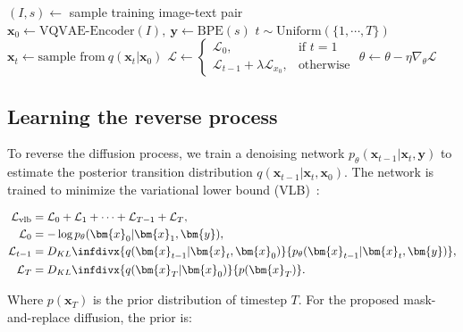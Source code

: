 \begin{algorithm}[t]
	\caption{Training of the VQ-Diffusion, given transition matrix $\{\bm{Q}_t\}$, initial network parameters $\theta$, loss weight $\lambda$, learning rate $\eta$.} \label{alg:training}
	\begin{algorithmic}[1]
		\Repeat \State $(I, s) \gets $ sample training image-text pair \State $\bm{x}_0 \gets \text{VQVAE-Encoder}(I), ~ \bm{y} \gets \text{BPE}(s)$
		\State $t \sim \text{Uniform}(\{1, \cdots, T\})$
		\State $\bm{x}_{t} \gets  \text{sample from}~q(\bm{x}_t|\bm{x}_0)$ 
		\State $\mathcal{L} \gets \begin{cases}
			\mathcal{L}_0, &\text{if } t = 1 \\
			\mathcal{L}_{t-1} + \lambda \mathcal{L}_{x_0}, &\text{otherwise}
		\end{cases}$ 
		\State $\theta \gets \theta - \eta \nabla_\theta \mathcal{L}$ 
	\end{algorithmic}
\end{algorithm}

\subsection{Learning the reverse process} To reverse the diffusion process, we train a denoising network $p_\theta(\bm{x}_{t-1}|\bm{x}_t,\bm{y})$ to estimate the posterior transition distribution $q(\bm{x}_{t-1}|\bm{x}_t, \bm{x}_0)$. The network is trained to minimize the variational lower bound (VLB)~\cite{sohl2015deep}:

\begin{equation}
\begin{split}
\mathcal{L}_{\mathrm{vlb}} &= \mathcal{L}_0 + \mathcal{L}_1 + \cdots + \mathcal{L}_{T-1} + \mathcal{L}_{T}, \\ 
\mathcal{L}_0 &= -\log p_\theta(\bm{x}_0|\bm{x}_1,\bm{y}), \\ 
\mathcal{L}_{t-1} &= \ensuremath{D_{KL}\infdivx{q(\bm{x}_{t-1}|\bm{x}_t,\bm{x}_0)}{p_\theta(\bm{x}_{t-1}|\bm{x}_t,\bm{y})}}, \\
\mathcal{L}_T &= \ensuremath{D_{KL}\infdivx{q(\bm{x}_T|\bm{x}_0)}{p(\bm{x}_T)}}.
\end{split}
\label{eqn:L_vlb}
\end{equation}

Where $p(\bm{x}_T)$ is the prior distribution of timestep $T$. For the proposed mask-and-replace diffusion, the prior is:

